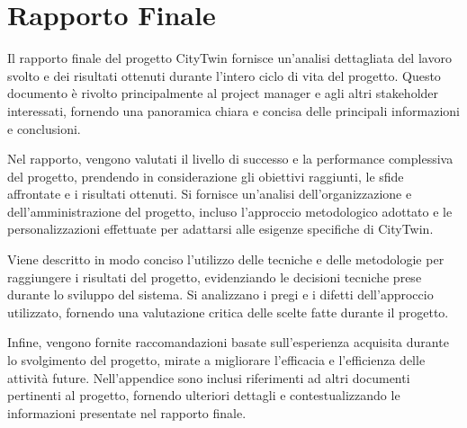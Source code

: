 \section{Rapporto Finale}
Il rapporto finale del progetto CityTwin fornisce un'analisi dettagliata del lavoro svolto e dei risultati ottenuti durante l'intero ciclo di vita del progetto. Questo documento è rivolto principalmente al project manager e agli altri stakeholder interessati, fornendo una panoramica chiara e concisa delle principali informazioni e conclusioni.

Nel rapporto, vengono valutati il livello di successo e la performance complessiva del progetto, prendendo in considerazione gli obiettivi raggiunti, le sfide affrontate e i risultati ottenuti. Si fornisce un'analisi dell'organizzazione e dell'amministrazione del progetto, incluso l'approccio metodologico adottato e le personalizzazioni effettuate per adattarsi alle esigenze specifiche di CityTwin.

Viene descritto in modo conciso l'utilizzo delle tecniche e delle metodologie per raggiungere i risultati del progetto, evidenziando le decisioni tecniche prese durante lo sviluppo del sistema. Si analizzano i pregi e i difetti dell'approccio utilizzato, fornendo una valutazione critica delle scelte fatte durante il progetto.

Infine, vengono fornite raccomandazioni basate sull'esperienza acquisita durante lo svolgimento del progetto, mirate a migliorare l'efficacia e l'efficienza delle attività future. Nell'appendice sono inclusi riferimenti ad altri documenti pertinenti al progetto, fornendo ulteriori dettagli e contestualizzando le informazioni presentate nel rapporto finale.